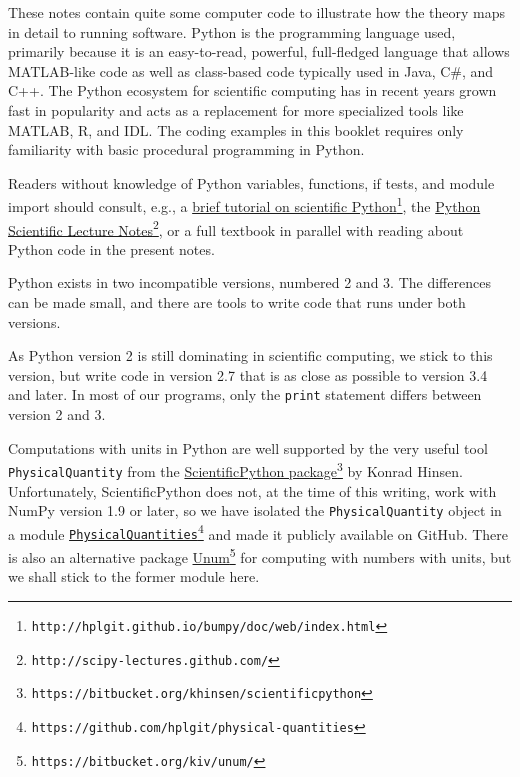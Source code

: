 \documentclass[graybox,envcountchap,sectrefs,final]{svmonodo}
\newenvironment{warning_mdfboxadmon}[1][]{
\begin{warning_mdfboxmdframed}[frametitle=#1]
}
{
\end{warning_mdfboxmdframed}
}
\begin{document}
These notes contain quite some computer code to illustrate how the theory
maps in detail to running software. Python is the programming language
used, primarily because it is an easy-to-read, powerful,
full-fledged language that allows MATLAB-like code
as well as class-based code typically used in Java, C\#, and C++.
The Python ecosystem for scientific computing has in recent years grown
fast in popularity and acts as a replacement for more specialized tools
like MATLAB, R, and IDL.
The coding examples in this booklet requires only familiarity with basic
procedural programming in Python.

Readers without knowledge of Python variables, functions, if tests,
and module import should consult, e.g., a \href{{http://hplgit.github.io/bumpy/doc/web/index.html}}{brief tutorial on scientific
Python}\footnote{\texttt{http://hplgit.github.io/bumpy/doc/web/index.html}},
the \href{{http://scipy-lectures.github.com/}}{Python Scientific Lecture Notes}\footnote{\texttt{http://scipy-lectures.github.com/}},
or a full textbook \cite{Langtangen_2012} in parallel with reading about
Python code in the present notes.


\begin{warning_mdfboxadmon}
Python exists in two incompatible versions, numbered 2 and 3.
The differences can be made small, and there are tools to write
code that runs under both versions.

As Python version 2 is still dominating
in scientific computing, we stick to this version, but
write code in version 2.7 that is as close as possible to version 3.4
and later. In most of our programs, only the \texttt{print} statement differs
between version 2 and 3.
\end{warning_mdfboxadmon}




Computations with units in Python are well supported by the
very useful tool \texttt{PhysicalQuantity} from the \href{{https://bitbucket.org/khinsen/scientificpython}}{ScientificPython package}\footnote{\texttt{https://bitbucket.org/khinsen/scientificpython}} by Konrad
Hinsen. Unfortunately, ScientificPython does not, at the time of this
writing, work with NumPy version 1.9 or later, so we have isolated the
\texttt{PhysicalQuantity} object in a module \href{{https://github.com/hplgit/physical-quantities}}{\nolinkurl{PhysicalQuantities}\footnote{\texttt{https://github.com/hplgit/physical-quantities}}} and made it publicly
available on GitHub. There is also an alternative package \href{{https://bitbucket.org/kiv/unum/}}{Unum}\footnote{\texttt{https://bitbucket.org/kiv/unum/}} for computing with numbers with
units, but we shall stick to the former module here.
\end{document}
